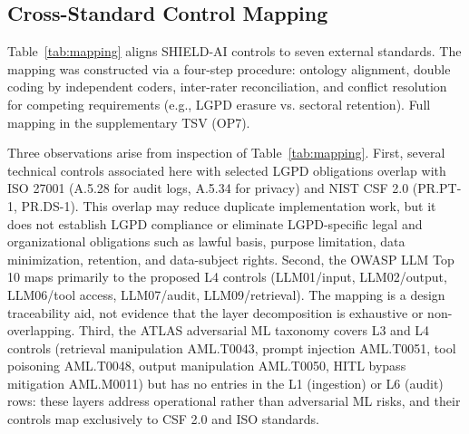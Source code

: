 \documentclass[journal]{IEEEtran}
\begin{document}
\subsection{Cross-Standard Control Mapping}
\label{ssec:mapping}

Table~\ref{tab:mapping} aligns SHIELD-AI controls to seven external standards. The mapping
was constructed via a four-step procedure: ontology alignment, double coding by independent
coders, inter-rater reconciliation, and conflict resolution for competing requirements
(e.g., LGPD erasure vs. sectoral retention). Full mapping in the supplementary TSV (OP7).

Three observations arise from inspection of Table~\ref{tab:mapping}. First, several technical
controls associated here with selected LGPD obligations overlap with ISO 27001 (A.5.28 for
audit logs, A.5.34 for privacy) and NIST CSF 2.0 (PR.PT-1, PR.DS-1). This overlap may reduce
duplicate implementation work, but it does not establish LGPD compliance or eliminate
LGPD-specific legal and organizational obligations such as lawful basis, purpose limitation,
data minimization, retention, and data-subject rights. Second, the OWASP LLM Top 10
\cite{owasp2025llm} maps primarily to the proposed L4 controls (LLM01/input, LLM02/output,
LLM06/tool access, LLM07/audit, LLM09/retrieval). The mapping is a design traceability aid,
not evidence that the layer decomposition is exhaustive or non-overlapping.
Third, the ATLAS adversarial ML taxonomy \cite{mitre2025atlas} covers L3 and L4 controls
(retrieval manipulation AML.T0043, prompt injection AML.T0051, tool poisoning AML.T0048,
output manipulation AML.T0050, HITL bypass mitigation AML.M0011) but has no entries in the
L1 (ingestion) or L6 (audit) rows: these layers address operational rather than adversarial ML
risks, and their controls map exclusively to CSF 2.0 and ISO standards.
\end{document}
